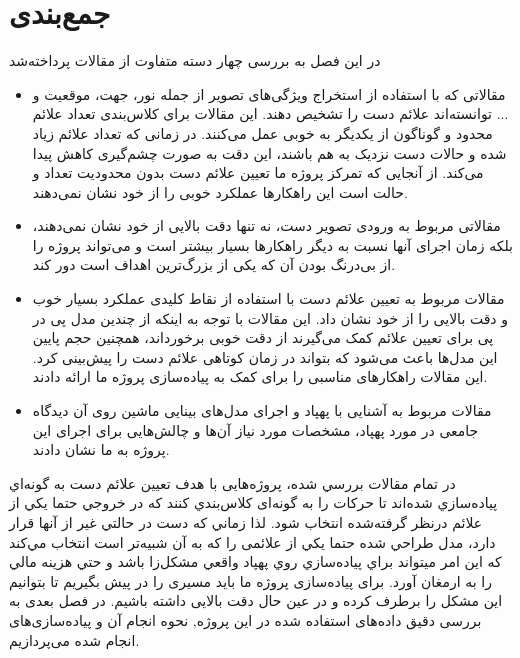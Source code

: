 \section{جمع‌بندی}

در این فصل به بررسی چهار دسته متفاوت از مقالات پرداخته‌شد 
\begin{itemize}
    \item مقالاتی که با استفاده از استخراج ویژگی‌های تصویر از جمله نور، جهت، موقعیت و ... توانسته‌اند علائم دست را تشخیص دهند. این مقالات برای کلاس‌بندی تعداد علائم محدود و گوناگون از یکدیگر به خوبی عمل می‌کنند. در زمانی که تعداد علائم زیاد شده و حالات دست نزدیک به هم باشند، این دقت به صورت چشم‌گیری کاهش پیدا می‌کند. از آنجایی که تمرکز پروژه ما تعیین علائم دست بدون محدودیت تعداد و حالت است این راهکار‌ها عملکرد خوبی را از خود نشان نمی‌دهند.
    \item مقالاتی مربوط به ورودی تصویر دست، نه تنها دقت بالایی از خود نشان نمی‌دهند، بلکه زمان اجرای آنها نسبت به دیگر راهکارها بسیار بیشتر است و می‌تواند پروژه را از بی‌درنگ بودن آن که یکی از بزرگ‌ترین اهداف است دور کند.
    \item مقالات مربوط به تعیین علائم دست با استفاده از نقاط کلیدی عملکرد بسیار خوب و دقت بالایی را از خود نشان داد. این مقالات با توجه به اینکه از چندین مدل پی در پی برای تعیین علائم کمک می‌گیرند از دقت خوبی برخورداند، همچنین حجم پایین این مدل‌ها باعث می‌شود که بتواند در زمان کوتاهی علائم دست را پیش‌بینی کرد. این مقالات راهکار‌های مناسبی را برای کمک به پیاده‌سازی پروژه ما ارائه دادند.
    \item مقالات مربوط به آشنایی با پهپاد و اجرای مدل‌های بینایی ماشین روی آن دیدگاه جامعی در مورد پهپاد، مشخصات مورد نیاز آن‌ها و چالش‌هایی برای اجرای این پروژه به ما نشان دادند.
\end{itemize}

در تمام مقالات بررسي شده، پروژه‌هایی با هدف تعیین علائم دست به گونه‌اي پياده‌سازي شده‌اند تا حركات را به گونه‌ای كلاس‌بندي كنند كه در خروجي حتما يكي از علائم درنظر گرفته‌شده انتخاب شود. لذا زماني كه دست در حالتي غير از آنها قرار دارد، مدل طراحي شده 
حتما يكي از علائمی را كه به آن شبيه‌تر است انتخاب مي‌كند كه اين امر ميتواند براي پياده‌سازي روي پهپاد واقعي مشكل‌زا باشد و حتي هزينه مالي را به ارمغان آورد. برای پیاده‌سازی پروژه ما باید مسیری را در پیش بگیریم تا بتوانیم این مشکل را برطرف کرده و در عین حال دقت بالایی داشته باشیم.
در فصل بعدی به بررسی دقیق داده‌های استفاده شده در این پروژه‌‌‌, نحوه انجام آن و پیاده‌سازی‌های انجام شده می‌پردازیم.
